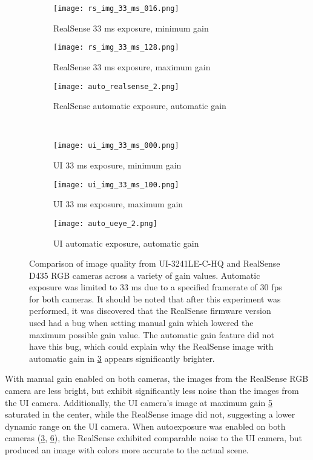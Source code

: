 \begin{figure}
	\centering
	\begin{subfigure}{0.32\textwidth}
		\texttt{[image: rs\_img\_33\_ms\_016.png]}
		\caption{RealSense 33 ms exposure, minimum gain}
		\label{rs_img_33_ms_016}
	\end{subfigure}		
	\hfill
	\begin{subfigure}{0.32\textwidth}
		\texttt{[image: rs\_img\_33\_ms\_128.png]}
		\caption{RealSense 33 ms exposure, maximum gain}
		\label{rs_img_33_ms_128}		
	\end{subfigure}
	\hfill
	\begin{subfigure}{0.32\textwidth}
		\texttt{[image: auto\_realsense\_2.png]}
		\caption{RealSense automatic exposure, automatic gain}
		\label{auto_realsense_2}
	\end{subfigure}
	\\
	\begin{subfigure}{0.32\textwidth}
		\texttt{[image: ui\_img\_33\_ms\_000.png]}
		\caption{UI 33 ms exposure, minimum gain}
		\label{ui_img_33_ms_000}
	\end{subfigure}		
	\hfill
	\begin{subfigure}{0.32\textwidth}
		\texttt{[image: ui\_img\_33\_ms\_100.png]}
		\caption{UI 33 ms exposure, maximum gain}
		\label{ui_img_33_ms_100}		
	\end{subfigure}
	\hfill
	\begin{subfigure}{0.32\textwidth}
		\texttt{[image: auto\_ueye\_2.png]}
		\caption{UI automatic exposure, automatic gain}
		\label{auto_ueye_2}
	\end{subfigure}		
	\caption[RGB camera image quality comparison]{Comparison of image quality from UI-3241LE-C-HQ and RealSense D435 RGB cameras across a variety of gain values. Automatic exposure was limited to 33 ms due to a specified framerate of 30 fps for both cameras. It should be noted that after this experiment was performed, it was discovered that the RealSense firmware version used had a bug when setting manual gain which lowered the maximum possible gain value. The automatic gain feature did not have this bug, which could explain why the RealSense image with automatic gain in \ref{auto_realsense_2} appears significantly brighter.}
	\label{camera_comparison}
\end{figure}

With manual gain enabled on both cameras, the images from the RealSense RGB camera are less bright, but exhibit significantly less noise than the images from the UI camera. Additionally, the UI camera's image at maximum gain \ref{ui_img_33_ms_100} saturated in the center, while the RealSense image did not, suggesting a lower dynamic range on the UI camera. When autoexposure was enabled on both cameras (\ref{auto_realsense_2}, \ref{auto_ueye_2}), the RealSense exhibited comparable noise to the UI camera, but produced an image with colors more accurate to the actual scene.

